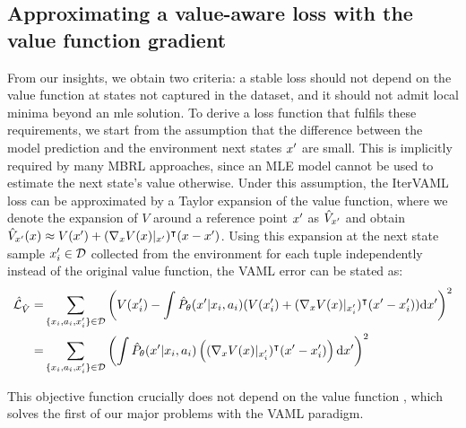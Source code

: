 \subsection{Approximating a value-aware loss with the value function gradient}
From our insights, we obtain two criteria: a stable loss should not depend on the value function at states not captured in the dataset, and it should not admit local minima beyond an \ac{mle} solution.
To derive a loss function that fulfils these requirements, we start from the assumption that the difference between the model prediction and the environment next states $x'$ are small.
This is implicitly required by many MBRL approaches, since an MLE model cannot be used to estimate the next state's value otherwise. 
Under this assumption, the IterVAML loss can be approximated by a Taylor expansion of the value function, where we denote the expansion of $V$ around a reference point $x'$ as $\hat{V}_{x'}$ and obtain $\hat{V}_{x'}(x) \approx V(x') + (\nabla_x V(x)|_{x'})^\intercal (x - x')$.
Using this expansion at the next state sample $x'_i \in \mathcal{D}$ collected from the environment for each tuple independently instead of the original value function, the VAML error can be stated as:
\begin{align}
    \hat{\mathcal{L}}_{\hat{V}}=&\sum_{\{x_i,a_i,x'_i\}\in\mathcal{D}}{\left(V(x'_i) - \int \hat{P}_\theta(x'|x_i,a_i) (V(x'_i) + (\nabla_x V(x)|_{x'_i})^\intercal (x' - x'_i)) \mathrm{d}x'\right)^2}\\
    =&\sum_{\{x_i,a_i,x'_i\}\in\mathcal{D}} {\left(\int \hat{P}_\theta(x'|x_i,a_i) \left((\nabla_x V(x)|_{x'_i})^\intercal(x' - x'_i) \right) \mathrm{d}x'\right)^2}
\end{align}

This objective function crucially does not depend on the value function , which solves the first of our major problems with the VAML paradigm.


